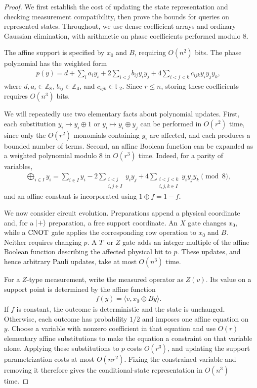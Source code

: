 \begin{proof}
We first establish the cost of updating the state representation and checking measurement compatibility, then prove the bounds for queries on represented states.
Throughout, we use dense coefficient arrays and ordinary Gaussian elimination, with arithmetic on phase coefficients performed modulo $8$.

The affine support is specified by $x_0$ and $B$, requiring $O(n^2)$ bits.
The phase polynomial has the weighted form
\begin{align}
    p(y)
    = d+\sum_i a_i y_i
    +2\sum_{i<j}b_{ij}y_i y_j
    +4\sum_{i<j<k}c_{ijk}y_i y_j y_k,
\end{align}
where $d,a_i\in\mathbb{Z}_8$, $b_{ij}\in\mathbb{Z}_4$, and $c_{ijk}\in\mathbb{F}_2$.
Since $r\leq n$, storing these coefficients requires $O(n^3)$ bits.

We will repeatedly use two elementary facts about polynomial updates.
First, each substitution $y_i\mapsto y_i\oplus 1$ or $y_i\mapsto y_i\oplus y_j$ can be performed in $O(r^2)$ time, since only the $O(r^2)$ monomials containing $y_i$ are affected, and each produces a bounded number of terms.
Second, an affine Boolean function can be expanded as a weighted polynomial modulo $8$ in $O(r^3)$ time.
Indeed, for a parity of variables,
\begin{align}
    \bigoplus_{i\in I}y_i
    =\sum_{i\in I}y_i
    -2\sum_{\substack{i<j\\i,j\in I}}y_i y_j
    +4\sum_{\substack{i<j<k\\i,j,k\in I}}y_i y_j y_k
    \pmod 8,
\end{align}
and an affine constant is incorporated using $1\oplus f=1-f$.

We now consider circuit evolution.
Preparations append a physical coordinate and, for a $|+\rangle$ preparation, a free support coordinate.
An $X$ gate changes $x_0$, while a $\operatorname{CNOT}$ gate applies the corresponding row operation to $x_0$ and $B$.
Neither requires changing $p$.
A $T$ or $Z$ gate adds an integer multiple of the affine Boolean function describing the affected physical bit to $p$.
These updates, and hence arbitrary Pauli updates, take at most $O(n^3)$ time.

For a $Z$-type measurement, write the measured operator as $Z(v)$.
Its value on a support point is determined by the affine function
\begin{align}
    f(y)=\langle v,x_0\oplus By\rangle.
\end{align}
If $f$ is constant, the outcome is deterministic and the state is unchanged.
Otherwise, each outcome has probability $1/2$ and imposes one affine equation on $y$.
Choose a variable with nonzero coefficient in that equation and use $O(r)$ elementary affine substitutions to make the equation a constraint on that variable alone.
Applying these substitutions to $p$ costs $O(r^3)$, and updating the support parametrization costs at most $O(nr^2)$.
Fixing the constrained variable and removing it therefore gives the conditional-state representation in $O(n^3)$ time.


\end{proof}
